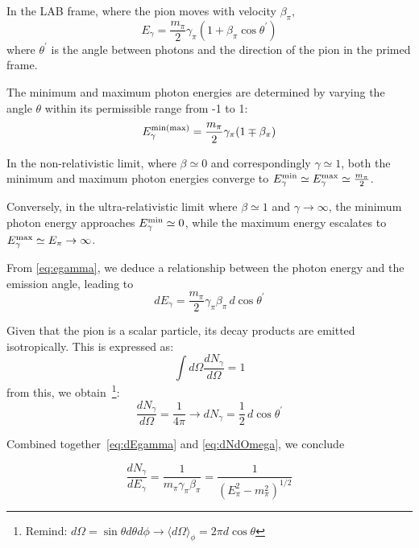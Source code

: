In the LAB frame, where the pion moves with velocity $\beta_\pi$,
%
\begin{equation}\label{eq:egamma}
E_\gamma = \frac{m_\pi}{2} \gamma_\pi (1+\beta_\pi \cos \theta^\prime)
\end{equation}
%
where $\theta^\prime$ is the angle between photons and the direction of the pion in the primed frame.

The minimum and maximum photon energies are determined by varying the angle \(\theta\) within its permissible range from -1 to 1:
%
\begin{equation}
E_{\gamma}^{\rm min(max)} = \frac{m_\pi}{2} \gamma_\pi (1 \mp \beta_\pi)
\end{equation}

In the non-relativistic limit, where \(\beta \simeq 0\) and correspondingly \(\gamma \simeq 1\), both the minimum and maximum photon energies converge to \( E_{\gamma}^{\rm min} \simeq E_{\gamma}^{\rm max} \simeq \frac{m_\pi}{2} \).

Conversely, in the ultra-relativistic limit where \(\beta \simeq 1\) and \(\gamma \rightarrow \infty\), the minimum photon energy approaches \( E_\gamma^{\rm min} \simeq 0 \), while the maximum energy escalates to \( E_\gamma^{\rm max} \simeq E_\pi \rightarrow \infty \).

From \cref{eq:egamma}, we deduce a relationship between the photon energy and the emission angle, leading to
%
\begin{equation}\label{eq:dEgamma}
dE_\gamma = \frac{m_\pi}{2} \gamma_\pi \beta_\pi \, d\!\cos\theta^\prime
\end{equation}

Given that the pion is a scalar particle, its decay products are emitted isotropically. This is expressed as:
%
\begin{equation}
\int d\Omega \frac{dN_\gamma}{d\Omega} = 1 
\end{equation}
%
from this, we obtain~\footnote{Remind: $d\Omega = \sin \theta d\theta d\phi \rightarrow \langle d\Omega \rangle_\phi = 2 \pi d\cos\theta$}:
%
\begin{equation}\label{eq:dNdOmega}
\frac{dN_\gamma}{d\Omega} = \frac{1}{4\pi} \rightarrow dN_\gamma = \frac{1}{2} \, d\!\cos\theta^\prime
\end{equation}

Combined together~\cref{eq:dEgamma} and \cref{eq:dNdOmega}, we conclude
%
\begin{remark}
\begin{equation}
\frac{dN_\gamma}{dE_\gamma} = \frac{1}{m_\pi \gamma_\pi \beta_\pi} = \frac{1}{(E^2_\pi - m_\pi^2)^{1/2}}
\end{equation}
\end{remark}

